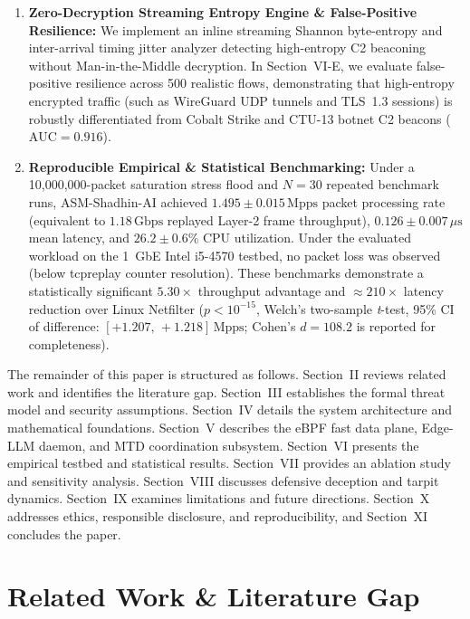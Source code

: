 \documentclass[journal]{IEEEtran}
\renewcommand{\_}{\textunderscore\allowbreak}
\begin{document}
\begin{enumerate}
  \item \textbf{Zero-Decryption Streaming Entropy Engine \& False-Positive Resilience:} We implement an inline
    streaming Shannon byte-entropy and inter-arrival timing jitter analyzer
    detecting high-entropy C2 beaconing without Man-in-the-Middle decryption.
    In Section~VI-E, we evaluate false-positive resilience across 500 realistic flows,
    demonstrating that high-entropy encrypted traffic (such as WireGuard UDP tunnels and TLS~1.3 sessions)
    is robustly differentiated from Cobalt Strike and CTU-13 botnet C2 beacons ($\text{AUC}=0.916$).

  \item \textbf{Reproducible Empirical \& Statistical Benchmarking:} Under a
    10,000,000-packet saturation stress flood and $N=30$ repeated benchmark runs,
    ASM-Shadhin-AI achieved $1.495 \pm 0.015\,\text{Mpps}$ packet processing rate
    (equivalent to $1.18\,\text{Gbps}$ replayed Layer-2 frame throughput),
    $0.126 \pm 0.007\,\mu\text{s}$ mean latency, and $26.2 \pm 0.6\%$ CPU utilization.
    Under the evaluated workload on the 1~GbE Intel i5-4570 testbed, no packet loss was
    observed (below tcpreplay counter resolution). These benchmarks demonstrate a
    statistically significant $5.30\times$ throughput advantage and $\approx\!210\times$
    latency reduction over Linux Netfilter ($p < 10^{-15}$, Welch's two-sample
    \textit{t}-test, 95\% CI of difference: $[+1.207,\, +1.218]\,\text{Mpps}$; Cohen's
    $d = 108.2$ is reported for completeness).
\end{enumerate}

The remainder of this paper is structured as follows.
Section~II reviews related work and identifies the literature gap.
Section~III establishes the formal threat model and security assumptions.
Section~IV details the system architecture and mathematical foundations.
Section~V describes the eBPF fast data plane, Edge-LLM daemon, and MTD
coordination subsystem. Section~VI presents the empirical testbed and statistical
results. Section~VII provides an ablation study and sensitivity analysis.
Section~VIII discusses defensive deception and tarpit dynamics. Section~IX
examines limitations and future directions. Section~X addresses ethics,
responsible disclosure, and reproducibility, and Section~XI concludes the paper.

\section{Related Work \& Literature Gap}
\end{document}
